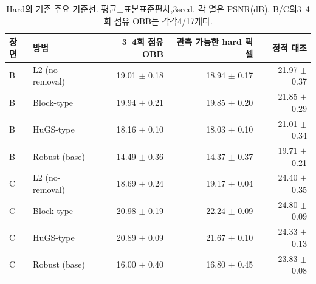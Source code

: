 \begin{table}[htbp]\centering\small
\caption{Hard의 기존 주요 기준선. 평균$\pm$표본표준편차,3seed. 각 열은 PSNR(dB). B/C의3--4회 점유 OBB는 각각4/17개다.}
\begin{tabular}{llrrr}\toprule 장면 & 방법 & 3--4회 점유 OBB & 관측 가능한 hard 픽셀 & 정적 대조\\\midrule
B & L2 (no-removal) & 19.01 $\pm$ 0.18 & 18.94 $\pm$ 0.17 & 21.97 $\pm$ 0.37 \\
B & Block-type & 19.94 $\pm$ 0.21 & 19.85 $\pm$ 0.20 & 21.85 $\pm$ 0.29 \\
B & HuGS-type & 18.16 $\pm$ 0.10 & 18.03 $\pm$ 0.10 & 21.01 $\pm$ 0.34 \\
B & Robust (base) & 14.49 $\pm$ 0.36 & 14.37 $\pm$ 0.37 & 19.71 $\pm$ 0.21 \\
C & L2 (no-removal) & 18.69 $\pm$ 0.24 & 19.17 $\pm$ 0.04 & 24.40 $\pm$ 0.35 \\
C & Block-type & 20.98 $\pm$ 0.19 & 22.24 $\pm$ 0.09 & 24.80 $\pm$ 0.09 \\
C & HuGS-type & 20.89 $\pm$ 0.09 & 21.67 $\pm$ 0.10 & 24.33 $\pm$ 0.13 \\
C & Robust (base) & 16.00 $\pm$ 0.40 & 16.80 $\pm$ 0.45 & 23.83 $\pm$ 0.08 \\\bottomrule\end{tabular}\end{table}
